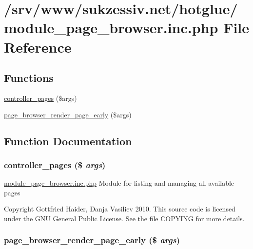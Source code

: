 \hypertarget{module__page__browser_8inc_8php}{
\section{/srv/www/sukzessiv.net/hotglue/module\_\-page\_\-browser.inc.php File Reference}
\label{module__page__browser_8inc_8php}
}
\subsection*{Functions}
\begin{CompactItemize}
\item 
\hyperlink{module__page__browser_8inc_8php_7e937f92734b69829f9d3ab5e00f14e0}{controller\_\-pages} (\$args)
\item 
\hyperlink{module__page__browser_8inc_8php_a94d17bbea100ee50f09c7bf4094a1db}{page\_\-browser\_\-render\_\-page\_\-early} (\$args)
\end{CompactItemize}


\subsection{Function Documentation}
\hypertarget{module__page__browser_8inc_8php_7e937f92734b69829f9d3ab5e00f14e0}{
\subsubsection[{controller\_\-pages}]{\setlength{\rightskip}{0pt plus 5cm}controller\_\-pages (\$ {\em args})}}
\label{module__page__browser_8inc_8php_7e937f92734b69829f9d3ab5e00f14e0}


\hyperlink{module__page__browser_8inc_8php}{module\_\-page\_\-browser.inc.php} Module for listing and managing all available pages

Copyright Gottfried Haider, Danja Vasiliev 2010. This source code is licensed under the GNU General Public License. See the file COPYING for more details. \hypertarget{module__page__browser_8inc_8php_a94d17bbea100ee50f09c7bf4094a1db}{
\subsubsection[{page\_\-browser\_\-render\_\-page\_\-early}]{\setlength{\rightskip}{0pt plus 5cm}page\_\-browser\_\-render\_\-page\_\-early (\$ {\em args})}}
\label{module__page__browser_8inc_8php_a94d17bbea100ee50f09c7bf4094a1db}


